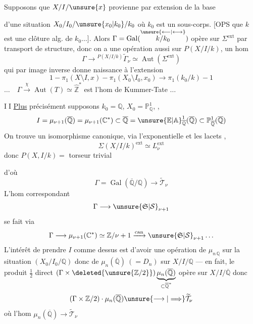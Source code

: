 Supposons que $X/I/\unsure{x}$ provienne
par extension de la base 

 d'une situation $X_0/I_0/\unsure{x_0|k_0}/k_0$
où $k_0$ est un sous-corps. [OPS  que
$k$ est une clôture alg. de $k_0\ldots$].
Alors $\Gamma=\operatorname{Gal}(\overset{\unsure{\longleftarrow|\longleftrightarrow}}{k/k_0})$ opère sur
$\Sigma^{\mathrm{ext}}$ par transport de structure, donc on a
une  opération aussi sur $P(X/I/k)$,
 un hom
\[
\Gamma\longrightarrow{}^{P(X/I/k)}\widetilde\Gamma_\nu
\simeq\operatorname{Aut}(\Sigma^{\mathrm{ext}})
\]
qui par image inverse  donne naissance
à l'extension
\[
1-\pi_1(X\setminus I,x)-\pi_1(X_0\setminus I_0,x_0)
\longrightarrow\pi_1(k_0/k)-1
\]
$\ldots\quad\Gamma\xrightarrow{\chi}\operatorname{Aut}(T)\simeq\widehat{\mathbb Z}^{*}$
est l'hom de Kummer-Tate $\ldots$

\textcircled{II} \uline{Plus} précisément supposons $k_0=\mathbb Q$, $X_0=\mathbb P^1_{\mathbb Q}$,
,
\[
I=\mu_{\nu+1}(\overline{\mathbb Q})=\mu_{\nu+1}(\mathbb C^{*})
\subset\overline{\mathbb Q}
=\unsure{\mathbb E|\mathbb A}^1_{\overline{\mathbb Q}}(\overline{\mathbb Q})
\subset\mathbb P^1_{\overline{\mathbb Q}}(\overline{\mathbb Q})
\]
On trouve un isomorphisme canonique,
via l'exponentielle et les lacets
,
\[
\Sigma(X/I/k)^{\mathrm{ext}}\simeq L_\nu^{\mathrm{ext}}
\]
donc $P(X,I/k)=$ torseur trivial

d'où
\[
\Gamma=\operatorname{Gal}(\overline{\mathbb Q}/\mathbb Q)
\longrightarrow\widetilde{\mathcal T}_\nu
\]
L'hom correspondant
\[
\Gamma\longrightarrow\unsure{\mathfrak S|\mathcal S}_{\nu+1}
\]
se fait via
\[
\Gamma\longrightarrow\mu_{\nu+1}(\mathbb C^{*})\simeq\mathbb Z/\nu+1
\xrightarrow{\mathrm{can}}\unsure{\mathfrak S|\mathcal S}_{\nu+1}\ldots
\]
L'intérêt de prendre $I$ comme
dessus est d'avoir une opération
de $\mu_{n\,\mathbb Q}$  sur la situation
$(X_0/I_0/\mathbb Q)$ donc de $\mu_n(\overline{\mathbb Q})\ (=D_n)$
sur $X/I/\mathbb Q$ --- en fait, le
produit $\tfrac12$ direct
$(\Gamma\times\deleted{\unsure{\mathbb Z/2}})\underbrace{\mu_n(\overline{\mathbb Q})}_{\subset\overline{\mathbb Q}^{*}}$\unsure{$=$}
opère sur $X/I/\overline{\mathbb Q}$ donc
\[
(\Gamma\times\mathbb Z/2)\cdot\mu_n(\overline{\mathbb Q})
\unsure{\longrightarrow|\Longrightarrow}
\widetilde{\mathcal T}_\nu
\]
où l'hom $\mu_n(\overline{\mathbb Q})\longrightarrow\widetilde{\mathcal T}_\nu$

